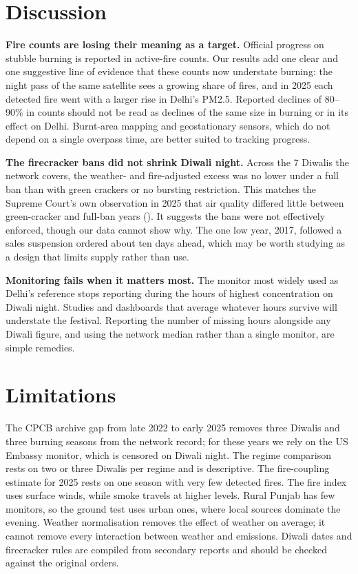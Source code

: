 \documentclass[
  11pt,
]{article}
\begin{document}
\section{Discussion}\label{discussion}

\textbf{Fire counts are losing their meaning as a target.} Official
progress on stubble burning is reported in active-fire counts. Our
results add one clear and one suggestive line of evidence that these
counts now understate burning: the night pass of the same satellite sees
a growing share of fires, and in 2025 each detected fire went with a
larger rise in Delhi's PM2.5. Reported declines of 80--90\% in counts
should not be read as declines of the same size in burning or in its
effect on Delhi. Burnt-area mapping and geostationary sensors, which do
not depend on a single overpass time, are better suited to tracking
progress.

\textbf{The firecracker bans did not shrink Diwali night.} Across the 7
Diwalis the network covers, the weather- and fire-adjusted excess was no
lower under a full ban than with green crackers or no bursting
restriction. This matches the Supreme Court's own observation in 2025
that air quality differed little between green-cracker and full-ban
years (). It suggests the bans
were not effectively enforced, though our data cannot show why. The one
low year, 2017, followed a sales suspension ordered about ten days
ahead, which may be worth studying as a design that limits supply rather
than use.

\textbf{Monitoring fails when it matters most.} The monitor most widely
used as Delhi's reference stops reporting during the hours of highest
concentration on Diwali night. Studies and dashboards that average
whatever hours survive will understate the festival. Reporting the
number of missing hours alongside any Diwali figure, and using the
network median rather than a single monitor, are simple remedies.

\section{Limitations}\label{limitations}

The CPCB archive gap from late 2022 to early 2025 removes three Diwalis
and three burning seasons from the network record; for these years we
rely on the US Embassy monitor, which is censored on Diwali night. The
regime comparison rests on two or three Diwalis per regime and is
descriptive. The fire-coupling estimate for 2025 rests on one season
with very few detected fires. The fire index uses surface winds, while
smoke travels at higher levels. Rural Punjab has few monitors, so the
ground test uses urban ones, where local sources dominate the evening.
Weather normalisation removes the effect of weather on average; it
cannot remove every interaction between weather and emissions. Diwali
dates and firecracker rules are compiled from secondary reports and
should be checked against the original orders.
\end{document}

